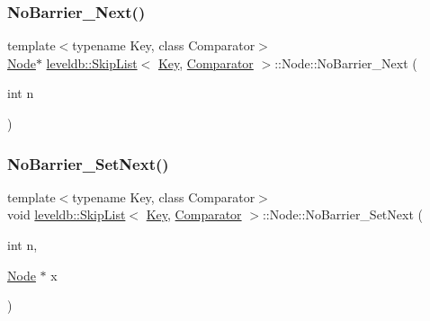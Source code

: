 \subsubsection{\texorpdfstring{NoBarrier\_Next()}{NoBarrier\_Next()}}
{\footnotesize\ttfamily template$<$typename Key, class Comparator$>$ \\
\mbox{\hyperlink{structleveldb_1_1_skip_list_1_1_node}{Node}}$\ast$ \mbox{\hyperlink{classleveldb_1_1_skip_list}{leveldb\+::\+Skip\+List}}$<$ \mbox{\hyperlink{namespaceleveldb_a7e9a9725b13fa0bd922d885280dfab95}{Key}}, \mbox{\hyperlink{structleveldb_1_1_comparator}{Comparator}} $>$\+::Node\+::\+No\+Barrier\+\_\+\+Next (\begin{DoxyParamCaption}\item[{int}]{n }\end{DoxyParamCaption})\hspace{0.3cm}{\ttfamily [inline]}}

\mbox{\label{structleveldb_1_1_skip_list_1_1_node_af93b362f5e38fcf645820e02377cca64}} 
\subsubsection{\texorpdfstring{NoBarrier\_SetNext()}{NoBarrier\_SetNext()}}
{\footnotesize\ttfamily template$<$typename Key, class Comparator$>$ \\
void \mbox{\hyperlink{classleveldb_1_1_skip_list}{leveldb\+::\+Skip\+List}}$<$ \mbox{\hyperlink{namespaceleveldb_a7e9a9725b13fa0bd922d885280dfab95}{Key}}, \mbox{\hyperlink{structleveldb_1_1_comparator}{Comparator}} $>$\+::Node\+::\+No\+Barrier\+\_\+\+Set\+Next (\begin{DoxyParamCaption}\item[{int}]{n,  }\item[{\mbox{\hyperlink{structleveldb_1_1_skip_list_1_1_node}{Node}} $\ast$}]{x }\end{DoxyParamCaption})\hspace{0.3cm}{\ttfamily [inline]}}

\mbox{\label{structleveldb_1_1_skip_list_1_1_node_a46c7cc10db3d77c85df7e411b720a8f4}} 
